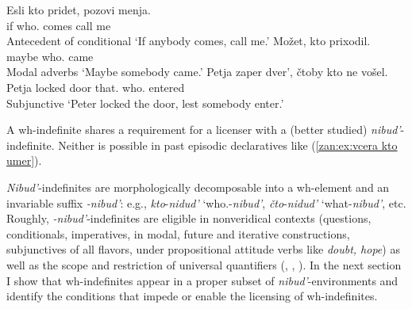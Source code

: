 \documentclass[output=paper,colorlinks,citecolor=brown]{langscibook}
\begin{document}
\ea \label{zan:ex:4 contexts}
\ea\label{zan:ex:esli kto pridet}
    \gll Esli 	kto 	pridet, 	pozovi 	menja. \\
    if 	who.{\INDF} 	comes 	call 	me \\\hfill Antecedent of conditional
    \glt `If anybody comes, call me.'
\ex\label{zan:ex: mozet kto prixodil}
\gll Možet, 	kto 	prixodil. \\
    maybe who.{\INDF} 	came \\\hfill Modal adverbs
    \glt `Maybe somebody came.'
\ex \label{zan:ex:ctoby kto ne vosel}
    \gll Petja 	zaper 	dver’, 	čtoby 	kto 	ne 	vošel.  \\
    Petja 	locked 	door 	that.{\SBJV} who.{\INDF} 	{\NEG} 	entered \\ \hfill Subjunctive
    \glt `Peter locked the door, lest somebody enter.'
\z
\z

\noindent A wh-indefinite shares a requirement for a licenser with a (better studied) \textit{nibud'}-indefinite. Neither is possible in past episodic declaratives like (\ref{zan:ex:vcera kto umer}). 

\z 

 \noindent \textit{Nibud'}-indefinites are morphologically decomposable into a wh-element and an invariable suffix \textit{-nibud'}: e.g., \textit{kto}-\textit{nidud'} `who.{\NOM}-\textit{nibud'}, \textit{čto}-\textit{nidud'} `what-\textit{nibud'}, etc. Roughly, \textit{-nibud'}-indefinites are eligible in nonveridical contexts (questions, conditionals, imperatives, in modal, future and iterative constructions, subjunctives of all flavors, under propositional attitude verbs like \textit{doubt, hope}) as well as the scope and restriction of universal quantifiers (\citealt{Fitzgibbons}, \citealt{paducheva2016}, \citealt{pereltsvaig2008}). In the next section I show that wh-indefinites appear in a proper subset of \textit{nibud'}-environments and identify the conditions that impede or enable the licensing of wh-indefinites.
\end{document}
